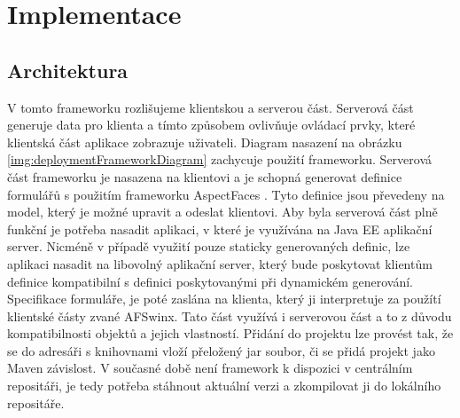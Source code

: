 \chapter{Implementace} 
\section{Architektura}
V tomto frameworku rozlišujeme klientskou a serverou část. Serverová část generuje data pro klienta a tímto způsobem ovlivňuje ovládací prvky, které klientská část aplikace zobrazuje uživateli. Diagram nasazení na obrázku \ref{img:deploymentFrameworkDiagram} zachycuje použití frameworku. Serverová část frameworku je nasazena na klientovi a je schopná generovat definice formulářů s použitím frameworku AspectFaces \cite{aspectFaces}. Tyto definice jsou převedeny na model, který je možné upravit a odeslat klientovi. Aby byla serverová část plně funkční je potřeba nasadit aplikaci, v které je využívána na Java EE aplikační server. Nicméně v případě využití pouze staticky generovaných definic, lze aplikaci nasadit na libovolný aplikační server, který bude poskytovat klientům definice kompatibilní s definici poskytovanými při dynamickém generování. Specifikace formuláře, je poté zaslána na klienta, který ji interpretuje za použítí klientské částy zvané AFSwinx. Tato část využívá i serverovou část a to z důvodu kompatibilnosti objektů a jejich vlastností. Přidání do projektu lze provést tak, že se do adresáři s knihovnami vloží přeložený jar soubor, či se přidá projekt jako Maven závislost. V současné době není framework k dispozici v centrálním repositáři, je tedy potřeba stáhnout aktuální verzi a zkompilovat ji do lokálního repositáře.  

